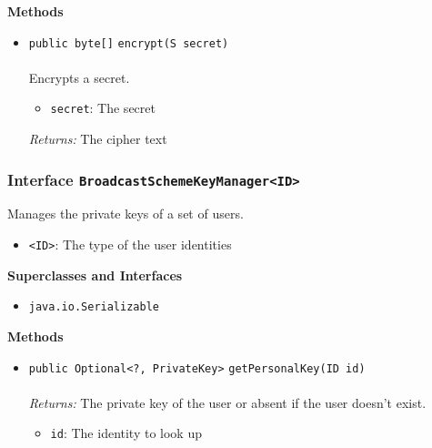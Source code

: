 \textbf{\sffamily Methods}
\begin{itemize}
\item \lstinline|public byte[]| \lstinline|encrypt|\lstinline|(S secret)|\\ \\[-0.6em]
Encrypts a secret.
\begin{itemize}
\item \lstinline|secret|: The secret
\end{itemize}

\emph{Returns:} The cipher text

\end{itemize}

\subsubsection{Interface \lstinline|BroadcastSchemeKeyManager<ID>|}
Manages the private keys of a set of users. \\
\noindent\begin{minipage}[t]{5cm}
\vspace{0.3em}
\hspace*{2em}
\vspace{0.3em}
\end{minipage}

\begin{itemize}
\item \lstinline|<ID>|: The type of the user identities
\end{itemize}


\textbf{\sffamily Superclasses and Interfaces}
\begin{itemize}
\item \lstinline|java.io.Serializable|
\end{itemize}



\textbf{\sffamily Methods}
\begin{itemize}
\item \lstinline|public Optional<?, PrivateKey>| \lstinline|getPersonalKey|\lstinline|(ID id)|\\ \\[-0.6em]
\emph{Returns:} The private key of the user or absent if the user doesn't exist.
\begin{itemize}
\item \lstinline|id|: The identity to look up
\end{itemize}



\end{itemize}


